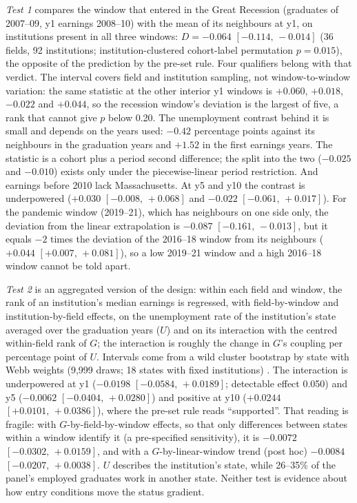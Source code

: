\documentclass[11pt]{article}
\newcommand{\ci}[2]{$[#1,\allowbreak\,#2]$}
\begin{document}
\emph{Test 1} compares the window that entered in the Great Recession (graduates of 2007--09, y1 earnings 2008--10)
with the mean of its neighbours at y1, on institutions present in all three windows: $D=-0.064$
\ci{-0.114}{-0.014} (36 fields, 92 institutions; institution-clustered cohort-label permutation $p=0.015$), the
opposite of the prediction by the pre-set rule. Four qualifiers belong with that verdict. The interval covers field
and institution sampling, not window-to-window variation: the same statistic at the other interior y1 windows is
$+0.060$, $+0.018$, $-0.022$ and $+0.044$, so the recession window's deviation is the largest of five, a rank that
cannot give $p$ below 0.20. The unemployment contrast behind it is small and depends on the years used: $-0.42$
percentage points against its neighbours in the graduation years and $+1.52$ in the first earnings years. The
statistic is a cohort plus a period second difference; the split into the two ($-0.025$ and $-0.010$) exists only
under the piecewise-linear period restriction. And earnings before 2010 lack Massachusetts. At y5 and y10 the
contrast is underpowered ($+0.030$ \ci{-0.008}{+0.068} and $-0.022$ \ci{-0.061}{+0.017}). For the pandemic window
(2019--21), which has neighbours on one side only, the deviation from the linear extrapolation is $-0.087$
\ci{-0.161}{-0.013}, but it equals $-2$ times the deviation of the 2016--18 window from its neighbours ($+0.044$
\ci{+0.007}{+0.081}), so a low 2019--21 window and a high 2016--18 window cannot be told apart.

\emph{Test 2} is an aggregated version of the \citet{oreopoulos2012short} design: within each field and window, the
rank of an institution's median earnings is regressed, with field-by-window and institution-by-field effects, on
the unemployment rate of the institution's state averaged over the graduation years ($U$) and on its interaction with
the centred within-field rank of $G$; the interaction is roughly the change in $G$'s coupling per percentage point of
$U$. Intervals come from a wild cluster bootstrap by state with Webb weights (9,999 draws; 18 states with fixed
institutions) \citep{cameron2008bootstrap, webb2023reworking}. The interaction is underpowered at y1 ($-0.0198$
\ci{-0.0584}{+0.0189}; detectable effect 0.050) and y5 ($-0.0062$ \ci{-0.0404}{+0.0280}) and positive at y10
($+0.0244$ \ci{+0.0101}{+0.0386}), where the pre-set rule reads ``supported''. That reading is fragile: with $G$-by-field-by-window
effects, so that only differences between states within a window identify it (a pre-specified sensitivity), it is
$-0.0072$ \ci{-0.0302}{+0.0159}, and with a $G$-by-linear-window trend (post hoc) $-0.0084$
\ci{-0.0207}{+0.0038}. $U$ describes the institution's state, while 26--35\% of the panel's employed graduates work
in another state. Neither test is evidence about how entry conditions move the status gradient.
\end{document}
